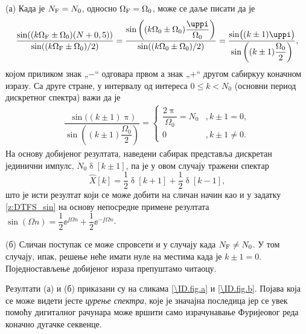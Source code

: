 (а) Када је $N_{\rm F} = N_0$, односно $\Omega_{\rm F} = \Omega_0$, може се даље писати да је 
\begin{eqnarray}
    \dfrac{\sin( (k \Omega_{\rm F} \pm \Omega_0)(N + 0,5) ) }{ \sin((k \Omega_{\rm F} \pm \Omega_0)/2) }
    = 
    \dfrac{\sin \left( (k \Omega_{\rm 0} \pm \Omega_0) \dfrac{\uppi}{\Omega_0} \right) }{ \sin((k \Omega_{\rm 0} \pm \Omega_0)/2) } 
    = \dfrac{ \sin \bigl( (k \pm 1)\uppi \bigr) }{ \sin \left( (k \pm 1)\dfrac{\Omega_0}2 \right)},
\end{eqnarray}
којом приликом знак „$-$“ одговара првом а знак „$+$“ другом сабиркуу коначном изразу.
Са друге стране, у интервалу од интереса $ 0 \leq k < N_{0}$ (основни период дискретног спектра) важи да је 
\begin{eqnarray}
    \dfrac{ \sin \bigl( (k \pm 1)\uppi \bigr) }{ \sin \left( (k \pm 1)\dfrac{\Omega_0}2 \right)} = 
    \begin{cases}
        \dfrac{2\uppi}{\Omega_0} = N_0 &, k \pm 1 = 0, \\
        0 &, k \pm 1 \neq 0.
    \end{cases}
\end{eqnarray}
На основу добијеног резултата, наведени сабирак представља дискретан јединични импулс, 
$N_0 \updelta[k \pm 1]$, па је у овом случају тражени спектар
\begin{equation}
    \hat X[k] = \dfrac{1}{2}\updelta[k + 1] + \dfrac{1}{2}\updelta[k - 1],
\end{equation}
што је исти резултат који се може добити на сличан начин као и у задатку \ref{z:DTFS_sin} на основу непосредне примене резултата
$\sin({\Omega n}) = \dfrac{1}{2} \ee^{\jj\Omega n} + \dfrac{1}{2} \ee^{-\jj\Omega n}$.

(б) Сличан поступак се може спровсети и у случају када $N_{\rm F} \neq N_0$. У том случају, ипак, решење неће имати нуле на местима када је 
$k \pm 1 = 0$. Поједностављење добијеног израза препуштамо читаоцу. 

Резултати (а) и (б) приказани су на сликама \ref{\ID.fig.a} и \ref{\ID.fig.b}. 
Појава која се може видети јесте \textit{цурење спектра}, које је значајна последица јер се увек помоћу дигиталног рачунара 
може вршити само израчунавање Фуријеовог реда коначно дугачке секвенце.


